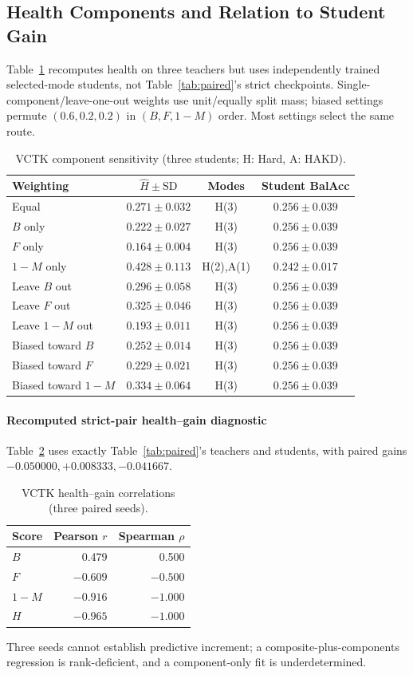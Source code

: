 \documentclass[journal]{IEEEtran}
\begin{document}
\subsection{Health Components and Relation to Student Gain}
Table~\ref{tab:weights} recomputes health on three teachers but uses independently trained selected-mode students, not Table~\ref{tab:paired}'s strict checkpoints. Single-component/leave-one-out weights use unit/equally split mass; biased settings permute $(0.6,0.2,0.2)$ in $(B,F,1-M)$ order. Most settings select the same route.
\begin{table}[t]
\centering\footnotesize\setlength{\tabcolsep}{2.8pt}
\caption{VCTK component sensitivity (three students; H: Hard, A: HAKD).}
\label{tab:weights}
\begin{tabular}{lccc}\toprule
Weighting & $\widehat H\pm\mathrm{SD}$ & Modes & Student BalAcc\\\midrule
Equal & $0.271\pm0.032$ & H(3) & $0.256\pm0.039$\\
$B$ only & $0.222\pm0.027$ & H(3) & $0.256\pm0.039$\\
$F$ only & $0.164\pm0.004$ & H(3) & $0.256\pm0.039$\\
$1-M$ only & $0.428\pm0.113$ & H(2),A(1) & $0.242\pm0.017$\\
Leave $B$ out & $0.296\pm0.058$ & H(3) & $0.256\pm0.039$\\
Leave $F$ out & $0.325\pm0.046$ & H(3) & $0.256\pm0.039$\\
Leave $1-M$ out & $0.193\pm0.011$ & H(3) & $0.256\pm0.039$\\
Biased toward $B$ & $0.252\pm0.014$ & H(3) & $0.256\pm0.039$\\
Biased toward $F$ & $0.229\pm0.021$ & H(3) & $0.256\pm0.039$\\
Biased toward $1-M$ & $0.334\pm0.064$ & H(3) & $0.256\pm0.039$\\\bottomrule
\end{tabular}
\end{table}
\paragraph*{Recomputed strict-pair health--gain diagnostic}
Table~\ref{tab:earlier_gain} uses exactly Table~\ref{tab:paired}'s teachers and students, with paired gains $-0.050000,+0.008333,-0.041667$.
\begin{table}[t]
\centering\footnotesize\setlength{\tabcolsep}{7pt}
\caption{VCTK health--gain correlations (three paired seeds).}
\label{tab:earlier_gain}
\begin{tabular}{lrr}\toprule
Score & Pearson $r$ & Spearman $\rho$\\\midrule
$B$ & 0.479 & 0.500\\
$F$ & $-0.609$ & $-0.500$\\
$1-M$ & $-0.916$ & $-1.000$\\
$H$ & $-0.965$ & $-1.000$\\\bottomrule
\end{tabular}
\end{table}
Three seeds cannot establish predictive increment; a composite-plus-components regression is rank-deficient, and a component-only fit is underdetermined.
\end{document}
